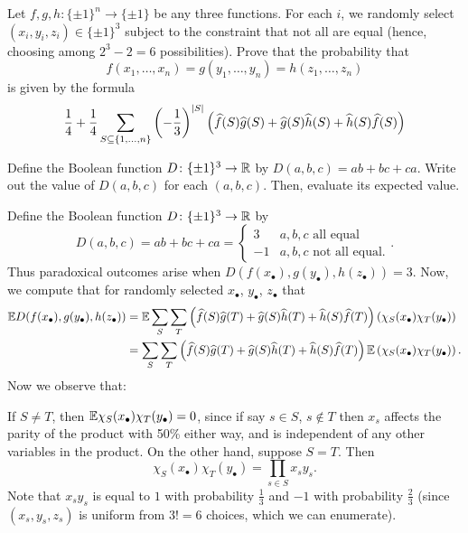 \begin{problem}
	\gim
	\label{prob:arrow_lemma}
	Let $f,g,h \colon \{\pm1\}^n \to \{\pm1\}$
	be any three functions.
	For each $i$, we randomly select $(x_i, y_i, z_i) \in \{\pm1\}^3$
	subject to the constraint that not all are equal
	(hence, choosing among $2^3-2=6$ possibilities).
	Prove that the probability that
	\[ f(x_1, \dots, x_n) = g(y_1, \dots, y_n) = h(z_1, \dots, z_n) \]
	is given by the formula
	\[ \frac14 + \frac14 \sum_{S \subseteq \{1, \dots, n\}}
		\left( -\frac13 \right)^{\left\lvert S \right\rvert}
		\left( \widehat f(S) \widehat g(S) + \widehat g(S) \widehat h(S) + \widehat h(S) \widehat f(S) \right)
		\]
	\begin{hint}
		Define the Boolean function $D \colon \{\pm 1\}^3 \to \mathbb R$ by
		$D(a,b,c) = ab+bc+ca$.
		Write out the value of $D(a,b,c)$ for each $(a,b,c)$.
		Then, evaluate its expected value.
	\end{hint}
	\begin{sol}
	Define the Boolean function $D \colon \{\pm 1\}^3 \to \mathbb R$ by
	\[ D(a,b,c) = ab + bc + ca
		= \begin{cases}
			3 & a,b,c \text{ all equal} \\
			-1 & a,b,c \text{ not all equal}.
		\end{cases}.
	\]
	Thus paradoxical outcomes arise when
	$D(f(x_\bullet), g(y_\bullet), h(z_\bullet)) = 3$.
	Now, we compute that for randomly selected
	$x_\bullet$, $y_\bullet$, $z_\bullet$ that
	\begin{align*}
		\mathbb E D(f(x_\bullet), g(y_\bullet), h(z_\bullet))
		&= \mathbb E \sum_S \sum_T
			\left( \widehat f(S) \widehat g(T) + \widehat g(S) \widehat h(T) + \widehat h(S) \widehat f(T) \right)
			\left( \chi_S(x_\bullet)\chi_T(y_\bullet) \right) \\
		&= \sum_S \sum_T
			\left( \widehat f(S) \widehat g(T) + \widehat g(S) \widehat h(T) + \widehat h(S) \widehat f(T) \right)
			\mathbb E\left( \chi_S(x_\bullet)\chi_T(y_\bullet) \right).
	\end{align*}
	Now we observe that:
	\begin{itemize}
		\ii If $S \neq T$, then $\mathbb E \chi_S(x_\bullet) \chi_T(y_\bullet) = 0$,
		since if say $s \in S$, $s \notin T$ then $x_s$ affects
		the parity of the product with 50\% either way,
		and is independent of any other variables in the product.
		\ii On the other hand, suppose $S = T$.
		Then
		\[ \chi_S(x_\bullet) \chi_T(y_\bullet)
			= \prod_{s \in S} x_sy_s. \]
		Note that $x_sy_s$ is equal to $1$ with probability $\frac13$
		and $-1$ with probability $\frac23$
		(since $(x_s, y_s, z_s)$ is uniform from $3!=6$ choices,
		which we can enumerate).

\end{itemize}
\end{sol}
\end{problem}
